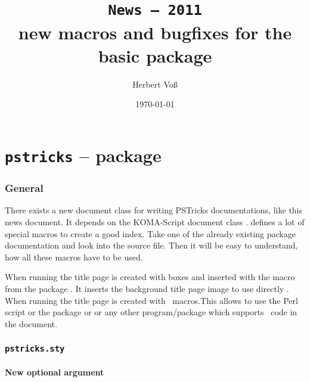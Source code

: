 \documentclass[11pt,english,BCOR10mm,DIV12,bibliography=totoc,parskip=false,smallheadings
    headexclude,footexclude,oneside]{pst-doc}
\let\Lfile\LFile
\begin{document}
\title{\texttt{News -- 2011}\\ \Large new macros and bugfixes for the
basic package }
\author{Herbert Voß}
\date{\today}

\maketitle

\clearpage
\tableofcontents

\clearpage
\part{\texttt{pstricks} -- package}

\section{General}
There exists a new document class  for writing PSTricks documentations,
like this news document. It depends on the KOMA-Script document class .
 defines a lot of special macros to create a good index. Take one of
the already existing package documentation and look into the source file. Then it will be
easy to understand, how all these macros have to be used.

When running  the title page is created with boxes and inserted 
with the macro  from the package . It
inserts the background title page image \Lfile{pst-doc-pdf} to use directly
.
When running  the title page
 is created with \PST\ macros.This allows to use the Perl script  or
the package  or  or any other program/package which
supports \PS\ code in the document.


\section{\texttt{pstricks.sty}}
\subsection{New optional argument}


\end{document}
